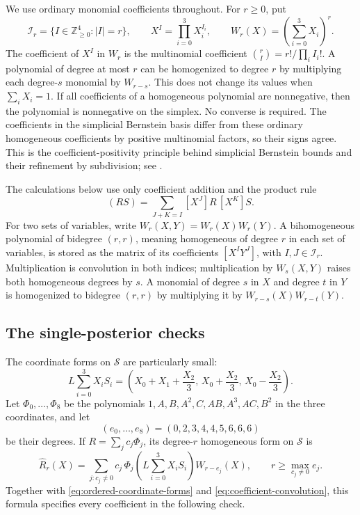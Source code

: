 We use ordinary monomial coefficients throughout. For $r\ge0$, put
\[
 \mathcal I_r=\{I\in\mathbb Z_{\ge0}^4:|I|=r\},\qquad
 X^I=\prod_{i=0}^3X_i^{I_i},\qquad
 W_r(X)=\left(\sum_{i=0}^3X_i\right)^r.
\]
The coefficient of $X^I$ in $W_r$ is the multinomial coefficient
$\binom rI=r!/\prod_iI_i!$. A polynomial of degree at most $r$ can be
homogenized to degree $r$ by multiplying each degree-$s$ monomial by
$W_{r-s}$. This does not change its values when $\sum_iX_i=1$.
If all coefficients of a homogeneous polynomial are nonnegative, then
the polynomial is nonnegative on the simplex. No converse is required.
The coefficients in the simplicial Bernstein basis differ from these
ordinary homogeneous coefficients by positive multinomial factors, so
their signs agree. This is the coefficient-positivity principle behind
simplicial Bernstein bounds and their refinement by subdivision;
see \cite{Leroy2012}.

The calculations below use only coefficient addition and the product rule
\begin{equation}
 [X^I](RS)=\sum_{J+K=I}[X^J]R\,[X^K]S.
 \label{eq:coefficient-convolution}
\end{equation}
For two sets of variables, write
$W_r(X,Y)=W_r(X)W_r(Y)$. A bihomogeneous polynomial of bidegree $(r,r)$,
meaning homogeneous of degree $r$ in each set of variables, is stored as
the matrix of its coefficients $[X^IY^J]$, with $I,J\in\mathcal I_r$.
Multiplication is convolution in both indices; multiplication by
$W_s(X,Y)$ raises both homogeneous degrees by $s$.
A monomial of degree $s$ in $X$ and degree $t$ in $Y$ is homogenized
to bidegree $(r,r)$ by multiplying it by
$W_{r-s}(X)W_{r-t}(Y)$.

\subsection{The single-posterior checks}

The coordinate forms on $\mathcal S$ are particularly small:
\begin{equation}
 L\sum_{i=0}^3X_iS_i
 =\left(X_0+X_1+\frac{X_2}{3},\,
         X_0+\frac{X_2}{3},\,
         X_0-\frac{X_2}{3}\right).
 \label{eq:ordered-coordinate-forms}
\end{equation}
Let $\Phi_0,\ldots,\Phi_8$ be the polynomials
$1,A,B,A^2,C,AB,A^3,AC,B^2$ in the three coordinates, and let
\[
 (e_0,\ldots,e_8)=(0,2,3,4,4,5,6,6,6)
\]
be their degrees. If $R=\sum_jc_j\Phi_j$, its degree-$r$ homogeneous
form on $\mathcal S$ is
\begin{equation}
 \widehat R_r(X)
 =\sum_{j:c_j\ne0}c_j\,
   \Phi_j\left(L\sum_{i=0}^3X_iS_i\right)W_{r-e_j}(X),
 \qquad r\ge\max_{c_j\ne0}e_j.
 \label{eq:scalar-homogenization}
\end{equation}
Together with \eqref{eq:ordered-coordinate-forms} and
\eqref{eq:coefficient-convolution}, this formula specifies every
coefficient in the following check.

